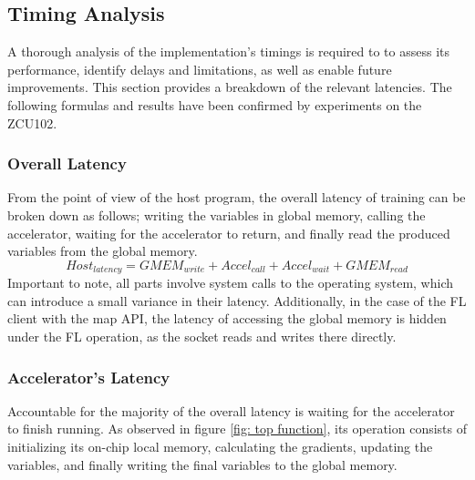 \subsection{Timing Analysis}
A thorough analysis of the implementation's timings is required to to assess its performance, identify delays and limitations, as well as enable future improvements. This section provides a breakdown of the relevant latencies. The following formulas and results have been confirmed by experiments on the ZCU102. %

\subsubsection{Overall Latency}
From the point of view of the host program, the overall latency of training can be broken down as follows; writing the variables in global memory, calling the accelerator, waiting for the accelerator to return, and finally read the produced variables from the global memory. %
\begin{equation}
	Host_{latency} = GMEM_{write} + Accel_{call} + Accel_{wait} + GMEM_{read}
	\label{eqn: host program, training latency}
\end{equation}
Important to note, all parts involve system calls to the operating system, which can introduce a small variance in their latency. Additionally, in the case of the FL client with the map API, the latency of accessing the global memory is hidden under the FL operation, as the socket reads and writes there directly. %

\subsubsection{Accelerator's Latency}
Accountable for the majority of the overall latency is waiting for the accelerator to finish running. As observed in figure \ref{fig: top function}, its operation consists of initializing its on-chip local memory, calculating the gradients, updating the variables, and finally writing the final variables to the global memory. %

